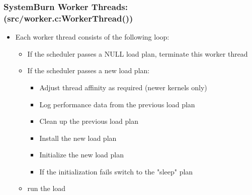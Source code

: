 \subsubsection{SystemBurn Worker Threads: (src/worker.c:WorkerThread())}

\begin{itemize}
	\item Each worker thread consists of the following loop:
	\begin{itemize}
		\item If the scheduler passes a NULL load plan, terminate this worker thread
		\item If the scheduler passes a new load plan:
		\begin{itemize}
			\item Adjust thread affinity as required (newer kernels only)
			\item Log performance data from the previous load plan
			\item Clean up the previous load plan
			\item Install the new load plan
			\item Initialize the new load plan
			\item If the initialization fails switch to the "sleep" plan
		\end{itemize}
		\item run the load
	\end{itemize}
\end{itemize}


